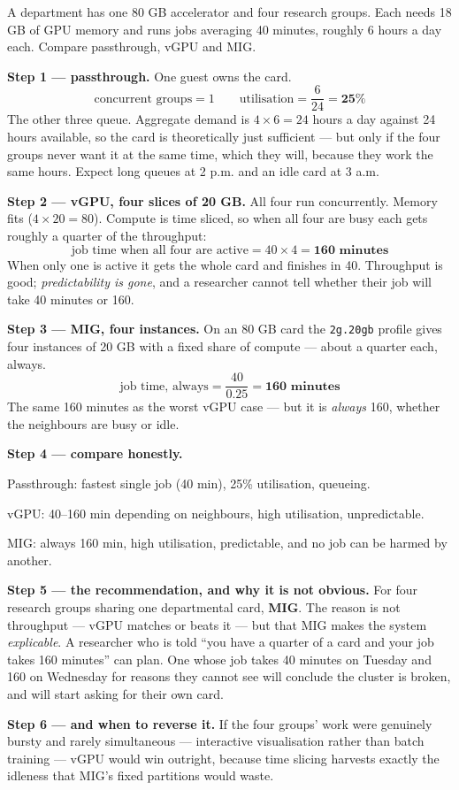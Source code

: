\begin{worked}
A department has one 80 GB accelerator and four research groups. Each needs
18 GB of GPU memory and runs jobs averaging 40 minutes, roughly 6 hours a day
each. Compare passthrough, vGPU and MIG.

\smallskip
\textbf{Step 1 --- passthrough.} One guest owns the card.
\[ \text{concurrent groups} = 1 \qquad
   \text{utilisation} = \frac{6}{24} = \mathbf{25\%} \]
The other three queue. Aggregate demand is $4 \times 6 = 24$ hours a day
against 24 hours available, so the card is theoretically just sufficient ---
but only if the four groups never want it at the same time, which they will,
because they work the same hours. Expect long queues at 2 p.m. and an idle card
at 3 a.m.

\smallskip
\textbf{Step 2 --- vGPU, four slices of 20 GB.} All four run concurrently.
Memory fits ($4 \times 20 = 80$). Compute is time sliced, so when all four are
busy each gets roughly a quarter of the throughput:
\[ \text{job time when all four are active} = 40 \times 4
   = \mathbf{160 \text{ minutes}} \]
When only one is active it gets the whole card and finishes in 40. Throughput
is good; \emph{predictability is gone}, and a researcher cannot tell whether
their job will take 40 minutes or 160.

\smallskip
\textbf{Step 3 --- MIG, four instances.} On an 80 GB card the
\texttt{2g.20gb} profile gives four instances of 20 GB with a fixed share of
compute --- about a quarter each, always.
\[ \text{job time, always} = \frac{40}{0.25} = \mathbf{160 \text{ minutes}} \]
The same 160 minutes as the worst vGPU case --- but it is \emph{always} 160,
whether the neighbours are busy or idle.

\smallskip
\textbf{Step 4 --- compare honestly.}
\begin{tight}
  \item Passthrough: fastest single job (40 min), 25\% utilisation, queueing.
  \item vGPU: 40--160 min depending on neighbours, high utilisation,
        unpredictable.
  \item MIG: always 160 min, high utilisation, predictable, and no job can be
        harmed by another.
\end{tight}

\smallskip
\textbf{Step 5 --- the recommendation, and why it is not obvious.} For four
research groups sharing one departmental card, \textbf{MIG}. The reason is not
throughput --- vGPU matches or beats it --- but that MIG makes the system
\emph{explicable}. A researcher who is told ``you have a quarter of a card and
your job takes 160 minutes'' can plan. One whose job takes 40 minutes on Tuesday
and 160 on Wednesday for reasons they cannot see will conclude the cluster is
broken, and will start asking for their own card.

\smallskip
\textbf{Step 6 --- and when to reverse it.} If the four groups' work were
genuinely bursty and rarely simultaneous --- interactive visualisation rather
than batch training --- vGPU would win outright, because time slicing harvests
exactly the idleness that MIG's fixed partitions would waste.
\end{worked}

